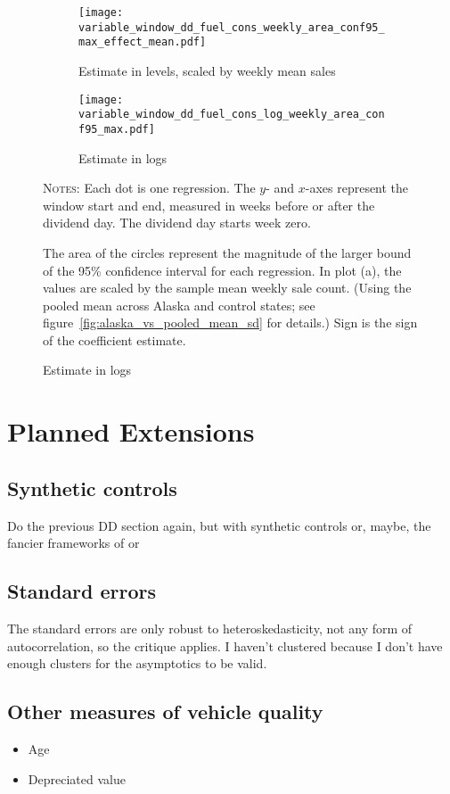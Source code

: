 \documentclass[11pt,letterpaper,oneside]{article}
\newcommand{\varWindowDDnotes}{%
Each dot is one regression.
The $y$- and $x$-axes represent the window start and end, measured in weeks before or after the dividend day.
The dividend day starts week zero.

 The area of the circles represent the magnitude of the larger bound of the 95\% confidence interval for each regression.
In plot (a), the values are scaled by the sample mean weekly sale count.
(Using the pooled mean across Alaska and control states; see figure~\ref{fig:alaska_vs_pooled_mean_sd} for details.)
Sign is the sign of the coefficient estimate. %
}
\begin{document}
\begin{doublespacing}
\begin{figure}[!hbtp]
    \caption{Fuel consumption effects with varying windows}
    \begin{subfigure}{0.97\linewidth}
        \caption{Estimate in levels, scaled by weekly mean sales}
        \texttt{[image: variable\_window\_dd\_fuel\_cons\_weekly\_area\_conf95\_max\_effect\_mean.pdf]}
    \end{subfigure}
    \begin{subfigure}{0.97\linewidth}
        \caption{Estimate in logs}
        \texttt{[image: variable\_window\_dd\_fuel\_cons\_log\_weekly\_area\_conf95\_max.pdf]}
    \end{subfigure}


    {\footnotesize
    \textsc{Notes:}
    \varWindowDDnotes
    }
\end{figure}



\section{Planned Extensions}

\subsection{Synthetic controls}
\label{sec:synthetic-controls}
Do the previous DD section again, but with synthetic controls or, maybe, the fancier frameworks of
\textcite{DoudchenkoImbens2016DD} or \textcite{Xu2016}

\subsection{Standard errors}
The standard errors are only robust to heteroskedasticity, not any form of autocorrelation, so the \textcite{bertrand_duflo2004DD} critique applies.
I haven't clustered because I don't have enough clusters for the asymptotics to be valid.

\subsection{Other measures of vehicle quality}
\begin{itemize}
    \item Age
    \item Depreciated value
\end{itemize}


\end{doublespacing}
\end{document}
